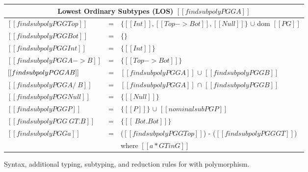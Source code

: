 \begin{figure}[t]
\begin{small}
        \begin{center}
       {\renewcommand{\arraystretch}{1.1}
         \begin{tabular}{|lcl|}
           \hline
           \multicolumn{3}{|c|}{Lowest Ordinary Subtypes (LOS) $[[findsubpoly PG G A]]$} \\
           \hline
           $[[findsubpoly PG G Top]]$ & = & $\{ [[Int]], [[Top -> Bot]], [[Null]]\}$ $\cup$ dom $[[PG]]$  \\
           $[[findsubpoly PG G Bot]]$ & = & $\{\}$  \\
           $[[findsubpoly PG G Int]]$ & = & $\{[[Int]]\}$  \\
           $[[findsubpoly PG G A -> B]]$ & = & $\{[[Top -> Bot]]\}$  \\
           $[[findsubpoly PG G A \/ B]]$ & = & $[[findsubpoly PG G A]]$ $\cup$ $[[findsubpoly PG G B]]$  \\
           $[[findsubpoly PG G A /\ B]]$ & = & $[[findsubpoly PG G A]]$ $\cap$ $[[findsubpoly PG G B]]$  \\
           $[[findsubpoly PG G Null]]$ & = & $\{ [[Null]]\}$  \\
           $[[findsubpoly PG G P]]$ & = & $\{[[P]]\}$ $\cup$ $[[nominalsub PG P]]$\\
           $[[findsubpoly PG G \ GT . B]]$ & = & $\{[[\ Bot . Bot]]\}$ \\
           $[[findsubpoly PG G a]]$ & = & ($[[findsubpoly PG G Top]]$) - ($[[findsubpoly PG G GT]]$) \\
            &   &  where $[[a * GT in G]]$ \\
            \hline
        \end{tabular} }
        \end{center}





  \end{small}
  \caption{Syntax, additional typing, subtyping, and reduction rules for \name with polymorphism.}
  \label{fig:discussion:poly}
\end{figure}

